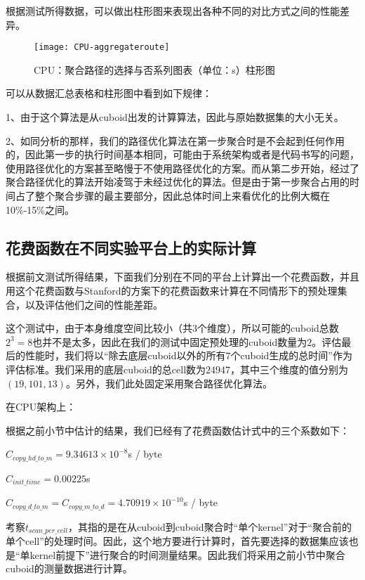 根据测试所得数据，可以做出柱形图来表现出各种不同的对比方式之间的性能差异。

\begin{figure}[ht]
\centering
\texttt{[image: CPU-aggregateroute]}
\caption{CPU：聚合路径的选择与否系列图表（单位：s）柱形图} 
\label{fig:figure6}
\end{figure}

可以从数据汇总表格和柱形图中看到如下规律：

1、由于这个算法是从cuboid出发的计算算法，因此与原始数据集的大小无关。

2、如同分析的那样，我们的路径优化算法在第一步聚合时是不会起到任何作用的，因此第一步的执行时间基本相同，可能由于系统架构或者是代码书写的问题，使用路径优化的方案甚至略慢于不使用路径优化的方案。而从第二步开始，经过了聚合路径优化的算法开始凌驾于未经过优化的算法。但是由于第一步聚合占用的时间占了整个聚合步骤的最主要部分，因此总体时间上来看优化的比例大概在10\%-15\%之间。

\subsection{花费函数在不同实验平台上的实际计算}

根据前文测试所得结果，下面我们分别在不同的平台上计算出一个花费函数，并且用这个花费函数与Stanford的方案下的花费函数来计算在不同情形下的预处理集合，以及评估他们之间的性能差距。

这个测试中，由于本身维度空间比较小（共$3$个维度），所以可能的cuboid总数$2^3 = 8$也并不是太多，因此在我们的测试中固定预处理的cuboid数量为$2$。评估最后的性能时，我们将以“除去底层cuboid以外的所有$7$个cuboid生成的总时间”作为评估标准。我们采用的底层cuboid的总cell数为$24947$，其中三个维度的值分别为$(19, 101, 13)$。另外，我们此处固定采用聚合路径优化算法。

在CPU架构上：

根据之前小节中估计的结果，我们已经有了花费函数估计式中的三个系数如下：

$C_{copy\_hd\_to\_m} = 9.34613 \times 10^{-8}$s / byte

$C_{init\_time} = 0.00225$s

$C_{copy\_d\_to\_m} = C_{copy\_m\_to\_d} = 4.70919 \times 10^{-10}$s / byte

考察$t_{scan\_per\_cell}$，其指的是在从cuboid到cuboid聚合时“单个kernel”对于“聚合前的单个cell”的处理时间。因此，这个地方要进行计算时，首先要选择的数据集应该也是“单kernel前提下”进行聚合的时间测量结果。因此我们将采用之前小节中聚合cuboid的测量数据进行计算。

